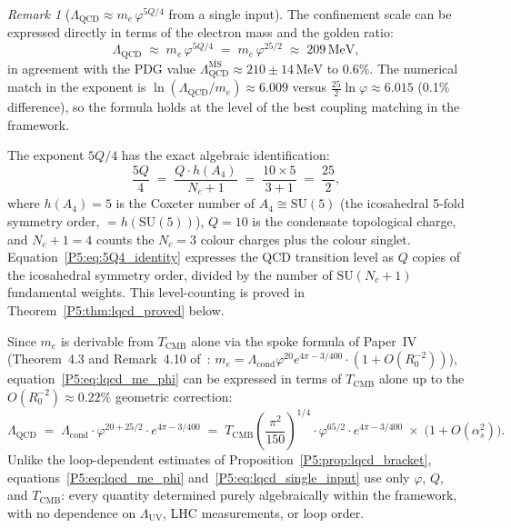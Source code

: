 \documentclass[11pt,a4paper]{article}
\theoremstyle{definition}
\theoremstyle{remark}
\newtheorem{remark}[theorem]{Remark}
\newcommand{\vp}{\varphi}
\newcommand{\TCMB}{T_{\mathrm{CMB}}}
\newcommand{\Lcond}{\Lambda_{\mathrm{cond}}}
\newcommand{\LUV}{\Lambda_{\mathrm{UV}}}
\newcommand{\LQCD}{\Lambda_{\mathrm{QCD}}}
\begin{document}
\begin{remark}[$\Lambda_{\mathrm{QCD}} \approx m_e\,\vp^{5Q/4}$ from a single input]
\label{P5:rem:lqcd_me_phi}
The confinement scale can be expressed directly in terms of the electron
mass and the golden ratio:
\begin{equation}
  \LQCD \;\approx\; m_e\,\vp^{5Q/4} \;=\; m_e\,\vp^{25/2} \;\approx\; 209\,\mathrm{MeV},
  \label{P5:eq:lqcd_me_phi}
\end{equation}
in agreement with the PDG value $\LQCD^{\overline{\mathrm{MS}}}\approx 210\pm14\,\mathrm{MeV}$
to $0.6\%$.  The numerical match in the exponent is
$\ln(\LQCD/m_e)\approx6.009$ versus $\tfrac{25}{2}\ln\vp\approx6.015$
(0.1\% difference), so the formula holds at the level of the best
coupling matching in the framework.

The exponent $5Q/4$ has the exact algebraic identification:
\begin{equation}
  \frac{5Q}{4} \;=\; \frac{Q \cdot h(A_4)}{N_c + 1}
  \;=\; \frac{10 \times 5}{3+1} \;=\; \frac{25}{2},
  \label{P5:eq:5Q4_identity}
\end{equation}
where $h(A_4) = 5$ is the Coxeter number of $A_4 \cong \mathrm{SU}(5)$
(the icosahedral 5-fold symmetry order, $= h(\mathrm{SU}(5))$),
$Q=10$ is the condensate topological charge, and $N_c + 1 = 4$
counts the $N_c=3$ colour charges plus the colour singlet.
Equation~\eqref{P5:eq:5Q4_identity} expresses the QCD transition level
as $Q$ copies of the icosahedral symmetry order, divided by the
number of $\mathrm{SU}(N_c+1)$ fundamental weights.
This level-counting is proved in Theorem~\ref{P5:thm:lqcd_proved} below.

Since $m_e$ is derivable from $\TCMB$ alone via the spoke formula
of Paper~IV~\cite{Paper4}
(Theorem~4.3 and Remark~4.10
of~\cite{Paper4}: $m_e = \Lcond\vp^{20}e^{4\pi-3/400}\cdot(1+O(R_0^{-2}))$),
equation~\eqref{P5:eq:lqcd_me_phi} can be expressed in terms of $\TCMB$ alone
up to the $O(R_0^{-2})\approx0.22\%$ geometric correction:
\begin{equation}
  \LQCD
  \;=\; \Lcond\cdot\vp^{20+25/2}\cdot e^{4\pi-3/400}
  \;=\; \TCMB\!\left(\frac{\pi^2}{150}\right)^{\!1/4}
        \cdot\vp^{65/2}\cdot e^{4\pi-3/400}
  \;\times\;\bigl(1+O(\alpha_s^2)\bigr).
  \label{P5:eq:lqcd_single_input}
\end{equation}
Unlike the loop-dependent estimates of Proposition~\ref{P5:prop:lqcd_bracket},
equations~\eqref{P5:eq:lqcd_me_phi} and~\eqref{P5:eq:lqcd_single_input}
use only $\vp$, $Q$, and $\TCMB$:
every quantity determined purely algebraically within the
framework, with no dependence on $\LUV$, LHC measurements, or loop order.
\end{remark}
\end{document}
